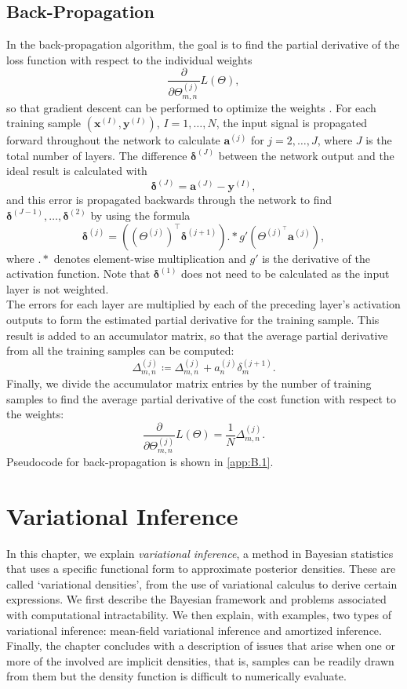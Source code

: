 \documentclass[honours,12pt, twoside]{unswthesis}
\numberwithin{equation}{section}
\theoremstyle{definition}
\begin{document}
\section{Back-Propagation}\label{sec:2.7}
In the back-propagation algorithm, the goal is to find the partial derivative of the loss function with respect to the individual weights \[\frac{\partial}{\partial\Theta_{m,n}^{(j)}}L(\Theta),\]
so that gradient descent can be performed to optimize the weights \citep{backprop}. For each training sample $\left(\bm{x}^{(I)},\bm{y}^{(I)}\right)$, $I=1,\dots,N$, the input signal is propagated forward throughout the network to calculate $\bm{a}^{(j)}$ for $j=2,\dots,J$, where $J$ is the total number of layers. The difference $\bm{\delta}^{(J)}$ between the network output and the ideal result is calculated with 
\[\bm{\delta}^{(J)}=\bm{a}^{(J)}-\bm{y}^{(I)},\] 
and this error is propagated backwards through the network to find $\bm{\delta}^{(J-1)},\dots,\bm{\delta}^{(2)}$ by using the formula 
\[\bm{\delta}^{(j)}=\left(\left(\Theta^{(j)}\right)^\top \bm{\delta}^{(j+1)}\right).*g'\left(\Theta^{(j)^\top} \bm{a}^{(j)}\right),\] 
where $.*$ denotes element-wise multiplication and $g'$ is the derivative of the activation function. Note that $\bm{\delta}^{(1)}$ does not need to be calculated as the input layer is not weighted. \\
The errors for each layer are multiplied by each of the preceding layer's activation outputs to form the estimated partial derivative for the training sample. This result is added to an accumulator matrix, so that the average partial derivative from all the training samples can be computed:
\[\Delta^{(j)}_{m,n}\coloneqq\Delta^{(j)}_{m,n}+a_n^{(j)}\delta_m^{(j+1)}.\]
Finally, we divide the accumulator matrix entries by the number of training samples to find the average partial derivative of the cost function with respect to the weights:
\[\frac{\partial}{\partial \Theta^{(j)}_{m,n}}L(\Theta)=\frac1N \Delta_{m,n}^{(j)}.\]
Pseudocode for back-propagation is shown in \autoref{app:B.1}.\\

\chapter{Variational Inference}\label{ch3}
In this chapter, we explain \textit{variational inference}, a method in Bayesian statistics that uses a specific functional form to approximate posterior densities. These are called `variational densities', from the use of variational calculus to derive certain expressions. We first describe the Bayesian framework and problems associated with computational intractability. We then explain, with examples, two types of variational inference: mean-field variational inference and amortized inference. Finally, the chapter concludes with a description of issues that arise when one or more of the involved are implicit densities, that is, samples can be readily drawn from them but the density function is difficult to numerically evaluate.
\end{document}
